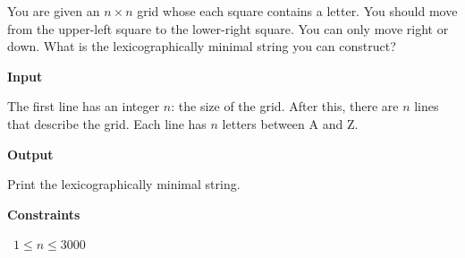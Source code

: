 You are given an $n \times n$ grid whose each square contains a letter.
You should move from the upper-left square to the lower-right square. You can only move right or down.
What is the lexicographically minimal string you can construct?

\vspace{0.3cm}\noindent\textbf{Input}

The first line has an integer $n$: the size of the grid.
After this, there are $n$ lines that describe the grid. Each line has $n$ letters between A and Z.

\vspace{0.3cm}\noindent\textbf{Output}

Print the lexicographically minimal string.

\vspace{0.3cm}\noindent\textbf{Constraints}

\textbullet\ $1 \le n \le 3000$